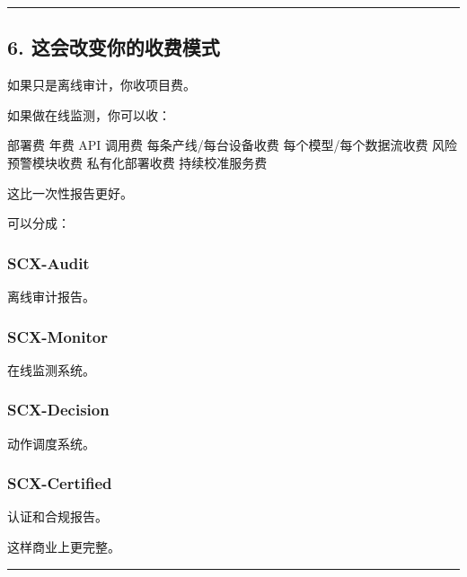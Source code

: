 \documentclass[
  12pt,
]{ctexart}
\newenvironment{Shaded}{}{}
\newcommand{\NormalTok}[1]{#1}
\begin{document}
\begin{center}\rule{0.5\linewidth}{0.5pt}\end{center}

\subsection{6.
这会改变你的收费模式}\label{ux8fd9ux4f1aux6539ux53d8ux4f60ux7684ux6536ux8d39ux6a21ux5f0f}

如果只是离线审计，你收项目费。

如果做在线监测，你可以收：

\begin{Shaded}
\begin{Highlighting}[]
\NormalTok{部署费}
\NormalTok{年费}
\NormalTok{API 调用费}
\NormalTok{每条产线/每台设备收费}
\NormalTok{每个模型/每个数据流收费}
\NormalTok{风险预警模块收费}
\NormalTok{私有化部署收费}
\NormalTok{持续校准服务费}
\end{Highlighting}
\end{Shaded}

这比一次性报告更好。

可以分成：

\subsubsection{SCX-Audit}\label{scx-audit}

离线审计报告。

\subsubsection{SCX-Monitor}\label{scx-monitor}

在线监测系统。

\subsubsection{SCX-Decision}\label{scx-decision}

动作调度系统。

\subsubsection{SCX-Certified}\label{scx-certified}

认证和合规报告。

这样商业上更完整。

\begin{center}\rule{0.5\linewidth}{0.5pt}\end{center}
\end{document}
